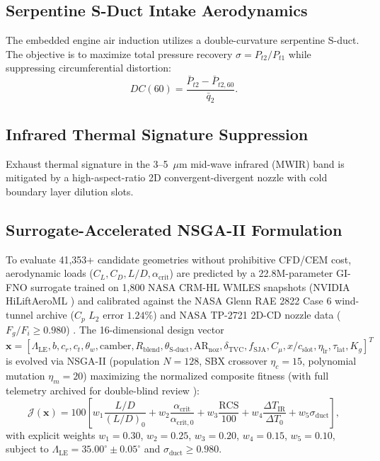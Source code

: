 \documentclass[journal,10pt,twocolumn]{IEEEtran}
\begin{document}
\subsection{Serpentine S-Duct Intake Aerodynamics}
The embedded engine air induction utilizes a double-curvature serpentine S-duct. The objective is to maximize total pressure recovery $\sigma = P_{t2} / P_{t1}$ while suppressing circumferential distortion:
\begin{equation}
DC(60) = \frac{\bar{P}_{t2} - \bar{P}_{t2,60}}{\bar{q}_2}.
\end{equation}

\subsection{Infrared Thermal Signature Suppression}
Exhaust thermal signature in the 3--5~$\mu$m mid-wave infrared (MWIR) band is mitigated by a high-aspect-ratio 2D convergent-divergent nozzle with cold boundary layer dilution slots.

\subsection{Surrogate-Accelerated NSGA-II Formulation}
To evaluate 41,353+ candidate geometries without prohibitive CFD/CEM cost, aerodynamic loads ($C_L, C_D, L/D, \alpha_{\text{crit}}$) are predicted by a 22.8M-parameter GI-FNO surrogate \cite{li2021fno} trained on 1,800 NASA CRM-HL WMLES snapshots (NVIDIA HiLiftAeroML \cite{hiliftaeroml2024}) and calibrated against the NASA Glenn RAE 2822 Case 6 wind-tunnel archive ($C_p$ $L_2$ error $1.24\%$) \cite{cook1979rae2822} and NASA TP-2721 2D-CD nozzle data ($F_g/F_i \ge 0.980$) \cite{berrier1987tp2721}. The 16-dimensional design vector $\mathbf{x} = [\Lambda_{\text{LE}}, b, c_r, c_t, \theta_w, \text{camber}, R_{\text{blend}}, \theta_{\text{S-duct}}, \text{AR}_{\text{noz}}, \delta_{\text{TVC}}, f_{\text{SJA}}, C_\mu, x/c_{\text{slot}}, \eta_{\text{lr}}, \tau_{\text{lat}}, K_g]^T$ is evolved via NSGA-II \cite{deb2002fast} (population $N = 128$, SBX crossover $\eta_c = 15$, polynomial mutation $\eta_m = 20$) maximizing the normalized composite fitness (with full telemetry archived for double-blind review \cite{dixit2026zenodo}):
\begin{equation}
\mathcal{J}(\mathbf{x}) = 100 \left[ w_1 \frac{L/D}{(L/D)_0} + w_2 \frac{\alpha_{\text{crit}}}{\alpha_{\text{crit},0}} + w_3 \frac{\text{RCS}}{100} + w_4 \frac{\Delta T_{\text{IR}}}{\Delta T_0} + w_5 \sigma_{\text{duct}} \right],
\end{equation}
with explicit weights $w_1 = 0.30$, $w_2 = 0.25$, $w_3 = 0.20$, $w_4 = 0.15$, $w_5 = 0.10$, subject to $\Lambda_{\text{LE}} = 35.00^\circ \pm 0.05^\circ$ and $\sigma_{\text{duct}} \ge 0.980$.
\end{document}
